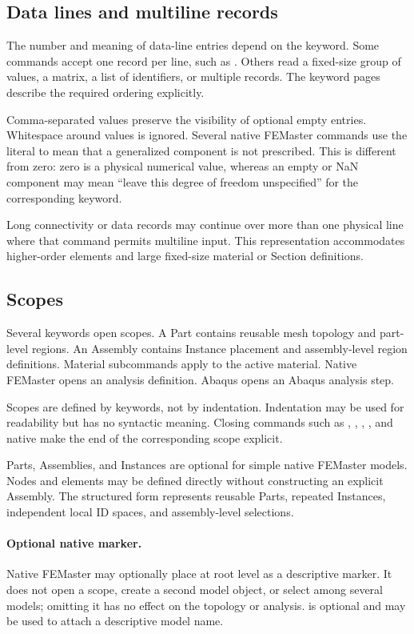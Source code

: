 \subsection{Data lines and multiline records}

The number and meaning of data-line entries depend on the keyword. Some commands accept one record per line, such as . Others read a fixed-size group of values, a matrix, a list of identifiers, or multiple records. The keyword pages describe the required ordering explicitly.

Comma-separated values preserve the visibility of optional empty entries. Whitespace around values is ignored. Several native FEMaster commands use the literal  to mean that a generalized component is not prescribed. This is different from zero: zero is a physical numerical value, whereas an empty or NaN component may mean ``leave this degree of freedom unspecified'' for the corresponding keyword.

Long connectivity or data records may continue over more than one physical line where that command permits multiline input. This representation accommodates higher-order elements and large fixed-size material or Section definitions.

\subsection{Scopes}

Several keywords open scopes. A Part contains reusable mesh topology and part-level regions. An Assembly contains Instance placement and assembly-level region definitions. Material subcommands apply to the active material. Native FEMaster  opens an analysis definition. Abaqus  opens an Abaqus analysis step.

Scopes are defined by keywords, not by indentation. Indentation may be used for readability but has no syntactic meaning. Closing commands such as , , , , and native  make the end of the corresponding scope explicit.

Parts, Assemblies, and Instances are optional for simple native FEMaster models. Nodes and elements may be defined directly without constructing an explicit Assembly. The structured form represents reusable Parts, repeated Instances, independent local ID spaces, and assembly-level selections.

\paragraph{Optional native  marker.}
Native FEMaster may optionally place  at root level as a descriptive marker. It does not open a scope, create a second model object, or select among several models; omitting it has no effect on the topology or analysis.  is optional and may be used to attach a descriptive model name.

